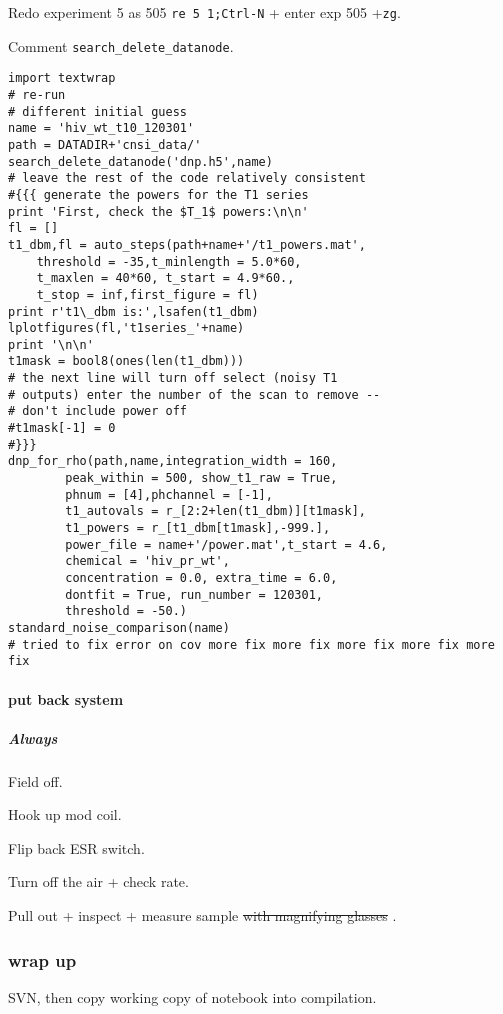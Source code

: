 Redo experiment 5 as 505 \texttt{re 5 1;Ctrl-N} + enter exp 505 +\texttt{zg}.

Comment {\tt search\_delete\_datanode}.


\begin{scriptsize}
\begin{lstlisting}
import textwrap
# re-run
# different initial guess
name = 'hiv_wt_t10_120301'
path = DATADIR+'cnsi_data/'
search_delete_datanode('dnp.h5',name)
# leave the rest of the code relatively consistent
#{{{ generate the powers for the T1 series
print 'First, check the $T_1$ powers:\n\n'
fl = []
t1_dbm,fl = auto_steps(path+name+'/t1_powers.mat',
    threshold = -35,t_minlength = 5.0*60,
    t_maxlen = 40*60, t_start = 4.9*60.,
    t_stop = inf,first_figure = fl)
print r't1\_dbm is:',lsafen(t1_dbm)
lplotfigures(fl,'t1series_'+name)
print '\n\n'
t1mask = bool8(ones(len(t1_dbm)))
# the next line will turn off select (noisy T1
# outputs) enter the number of the scan to remove --
# don't include power off
#t1mask[-1] = 0
#}}}
dnp_for_rho(path,name,integration_width = 160,
        peak_within = 500, show_t1_raw = True,
        phnum = [4],phchannel = [-1],
        t1_autovals = r_[2:2+len(t1_dbm)][t1mask],
        t1_powers = r_[t1_dbm[t1mask],-999.],
        power_file = name+'/power.mat',t_start = 4.6,
        chemical = 'hiv_pr_wt',
        concentration = 0.0, extra_time = 6.0,
        dontfit = True, run_number = 120301,
        threshold = -50.)
standard_noise_comparison(name)
# tried to fix error on cov more fix more fix more fix more fix more fix
\end{lstlisting}
\end{scriptsize}

\paragraph{put back system}
\subparagraph{Always}
Field off.

Hook up mod coil. 

Flip back ESR switch.

Turn off the air + check rate.

Pull out + inspect + measure sample\sout{  with magnifying glasses }.

\subsubsection{wrap up}
SVN, then copy working copy of notebook into compilation.

